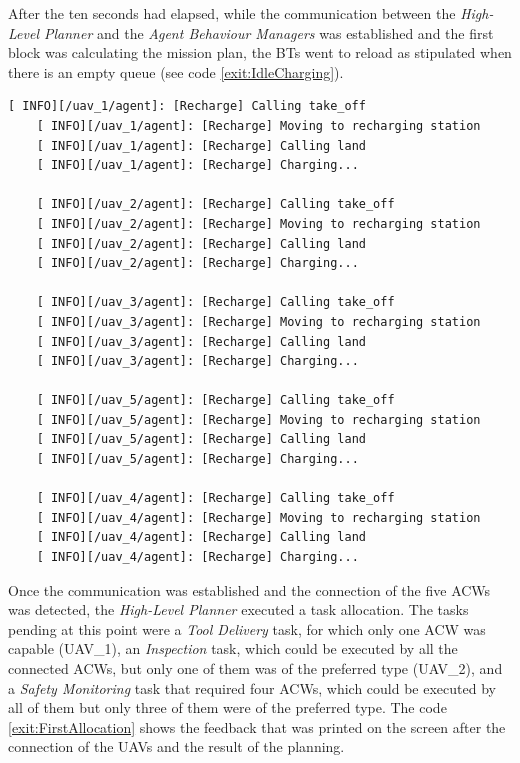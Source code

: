 After the ten seconds had elapsed, while the communication between the \emph{High-Level Planner} and the \emph{Agent Behaviour Managers} was established and the first block was calculating the mission plan, the \glspl{BT} went to reload as stipulated when there is an empty queue (see code \ref{exit:IdleCharging}).

\begin{lstlisting}[caption={Feedback messages printed before the ACWs received their new queues}, breaklines=true, label=exit:IdleCharging]
    [ INFO][/uav_1/agent]: [Recharge] Calling take_off
    [ INFO][/uav_1/agent]: [Recharge] Moving to recharging station
    [ INFO][/uav_1/agent]: [Recharge] Calling land
    [ INFO][/uav_1/agent]: [Recharge] Charging...
    
    [ INFO][/uav_2/agent]: [Recharge] Calling take_off
    [ INFO][/uav_2/agent]: [Recharge] Moving to recharging station
    [ INFO][/uav_2/agent]: [Recharge] Calling land
    [ INFO][/uav_2/agent]: [Recharge] Charging...
    
    [ INFO][/uav_3/agent]: [Recharge] Calling take_off
    [ INFO][/uav_3/agent]: [Recharge] Moving to recharging station
    [ INFO][/uav_3/agent]: [Recharge] Calling land
    [ INFO][/uav_3/agent]: [Recharge] Charging...
    
    [ INFO][/uav_5/agent]: [Recharge] Calling take_off
    [ INFO][/uav_5/agent]: [Recharge] Moving to recharging station
    [ INFO][/uav_5/agent]: [Recharge] Calling land
    [ INFO][/uav_5/agent]: [Recharge] Charging...
    
    [ INFO][/uav_4/agent]: [Recharge] Calling take_off
    [ INFO][/uav_4/agent]: [Recharge] Moving to recharging station
    [ INFO][/uav_4/agent]: [Recharge] Calling land
    [ INFO][/uav_4/agent]: [Recharge] Charging...
\end{lstlisting}

Once the communication was established and the connection of the five \glspl{ACW} was detected, the \emph{High-Level Planner} executed a task allocation. The tasks pending at this point were a \emph{Tool Delivery} task, for which only one \gls{ACW} was capable (UAV\_1), an \emph{Inspection} task, which could be executed by all the connected \glspl{ACW}, but only one of them was of the preferred type (UAV\_2), and a \emph{Safety Monitoring} task that required four \glspl{ACW}, which could be executed by all of them but only three of them were of the preferred type. The code \ref{exit:FirstAllocation} shows the feedback that was printed on the screen after the connection of the \glspl{UAV} and the result of the planning.

